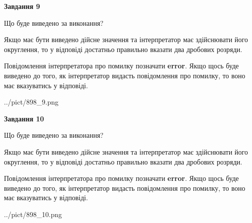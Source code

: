 \documentclass[12pt, ukrainian]{article}
\begin{document}
{\begin {Large}
{\begin {center}\textbf{Завдання 9}\end {center}}\par
Що буде виведено за виконання? \par

Якщо має бути виведено дійсне значення та інтерпретатор має здійснювати його округлення, 
то у відповіді достатньо правильно вказати два дробових розряди.

Повідомлення інтерпретатора про помилку позначати \textbf{error}.
Якщо щось буде виведено до того, як інтерпретатор видасть повідомлення про помилку, 
то воно має вказуватись у відповіді. \par

\begin{center}
	{../pict/898_9.png}
\end{center}
\newpage

{\begin {center}\textbf{Завдання 10}\end {center}}\par
Що буде виведено за виконання? \par

Якщо має бути виведено дійсне значення та інтерпретатор має здійснювати його округлення, 
то у відповіді достатньо правильно вказати два дробових розряди.

Повідомлення інтерпретатора про помилку позначати \textbf{error}.
Якщо щось буде виведено до того, як інтерпретатор видасть повідомлення про помилку, 
то воно має вказуватись у відповіді. \par

\begin{center}
	{../pict/898_10.png}
\end{center}
\newpage

\end {Large}}
\end{document}
